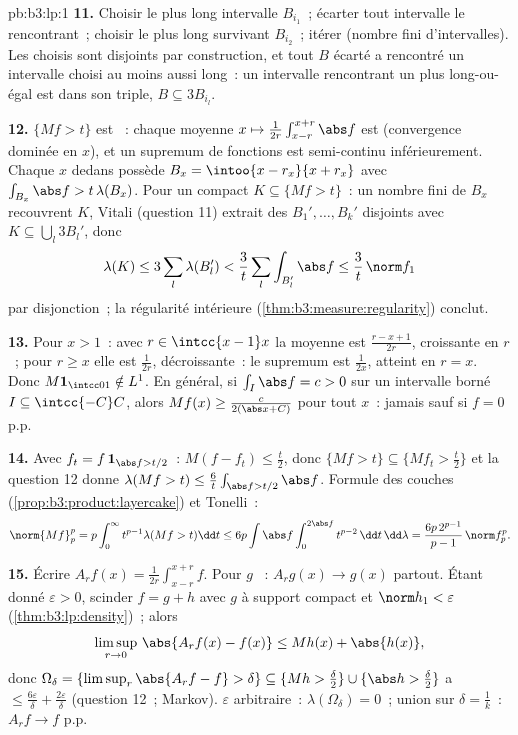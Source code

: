 \begin{solution}{pb:b3:lp:1}
\textbf{11.} Choisir le plus long intervalle $B_{i_1}$~;
écarter tout intervalle le rencontrant~; choisir le plus
long survivant $B_{i_2}$~; itérer (nombre fini
d'intervalles). Les choisis sont disjoints par
construction, et tout $B$ écarté a rencontré un intervalle
choisi au moins aussi long~: un intervalle rencontrant un
plus long-ou-égal est  dans son triple, $B \subseteq
3B_{i_l}$.

\textbf{12.} $\{Mf > t\}$ est ~: chaque moyenne $x
\mapsto \frac1{2r}\int_{x-r}^{x+r}\abs f$ est 
(convergence dominée en $x$), et un supremum de fonctions
 est semi-continu inférieurement. Chaque $x$ dedans
possède $B_x = \intoo{x-r_x}{x+r_x}$ avec $\int_{B_x}\abs f
> t\,\lambda(B_x)$. Pour un compact $K \subseteq \{Mf >
t\}$~: un nombre fini de $B_x$ recouvrent $K$, Vitali
(question 11) extrait des $B_1', \dots, B_k'$ disjoints
avec $K \subseteq \bigcup_l3B_l'$, donc
\[
\lambda(K) \leq 3\sum_l\lambda(B_l') <
\frac3t\sum_l\int_{B_l'}\abs f \leq \frac3t\,\norm f_1
\]
par disjonction~; la régularité intérieure
(\cref{thm:b3:measure:regularity}) conclut.

\textbf{13.} Pour $x > 1$~: avec $r \in \intcc{x-1}x$ la
moyenne est $\frac{r - x + 1}{2r}$, croissante en $r$~;
pour $r \geq x$ elle est $\frac1{2r}$, décroissante~: le
supremum est $\frac1{2x}$, atteint en $r = x$. Donc
$M\mathbf 1_{\intcc01} \notin L^1$. En général, si
$\int_I\abs f = c > 0$ sur un intervalle borné $I \subseteq
\intcc{-C}C$, alors $Mf(x) \geq \frac{c}{2(\abs x + C)}$
pour tout $x$~: jamais  sauf si $f = 0$ p.p.

\textbf{14.} Avec $f_t = f\,\mathbf 1_{\abs f > t/2}$~:
$M(f - f_t) \leq \frac t2$, donc $\{Mf > t\} \subseteq
\{Mf_t > \frac t2\}$ et la question 12 donne $\lambda(Mf >
t) \leq \frac6t\int_{\abs f > t/2}\abs f$. Formule des
couches (\cref{prop:b3:product:layercake}) et Tonelli~:
\[
\norm{Mf}_p^p = p\int_0^\infty t^{p-1}\lambda(Mf > t)\dd t
\leq 6p\int\abs f\int_0^{2\abs f}t^{p-2}\,\dd t\,\dd\lambda
= \frac{6p\,2^{p-1}}{p-1}\,\norm f_p^p .
\]

\textbf{15.} Écrire $A_rf(x) = \frac1{2r}\int_{x-r}^{x+r}f$.
Pour $g$ ~: $A_rg(x) \to g(x)$ partout. Étant donné
$\varepsilon > 0$, scinder $f = g + h$ avec $g$  à
support compact et $\norm h_1 < \varepsilon$
(\cref{thm:b3:lp:density})~; alors
\[
\limsup_{r\to0}\,\abs{A_rf(x) - f(x)} \leq Mh(x) +
\abs{h(x)},
\]
donc $\Omega_\delta = \{\limsup_r\abs{A_rf - f} > \delta\}
\subseteq \{Mh > \tfrac\delta2\} \cup \{\abs h >
\tfrac\delta2\}$ a  $\leq \frac{6\varepsilon}\delta
+ \frac{2\varepsilon}\delta$ (question 12~; Markov).
$\varepsilon$ arbitraire~: $\lambda(\Omega_\delta) = 0$~;
union sur $\delta = \frac1k$~: $A_rf \to f$ p.p.


\end{solution}
